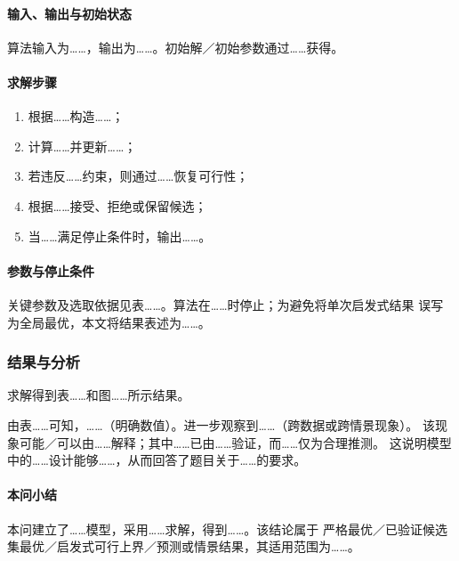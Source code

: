 \paragraph{输入、输出与初始状态}
算法输入为……，输出为……。初始解／初始参数通过……获得。

\paragraph{求解步骤}
\begin{enumerate}[label=\arabic*.,leftmargin=3em]
  \item 根据……构造……；
  \item 计算……并更新……；
  \item 若违反……约束，则通过……恢复可行性；
  \item 根据……接受、拒绝或保留候选；
  \item 当……满足停止条件时，输出……。
\end{enumerate}

\paragraph{参数与停止条件}
关键参数及选取依据见表……。算法在……时停止；为避免将单次启发式结果
误写为全局最优，本文将结果表述为……。

\subsubsection{结果与分析}

求解得到表……和图……所示结果。

由表……可知，……（明确数值）。进一步观察到……（跨数据或跨情景现象）。
该现象可能／可以由……解释；其中……已由……验证，而……仅为合理推测。
这说明模型中的……设计能够……，从而回答了题目关于……的要求。

\paragraph{本问小结}
本问建立了……模型，采用……求解，得到……。该结论属于
严格最优／已验证候选集最优／启发式可行上界／预测或情景结果，其适用范围为……。
